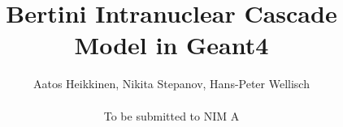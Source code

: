 \def \PIC {pictures}

\title{Bertini Intranuclear Cascade Model in {\sc Geant4} }

\author{Aatos Heikkinen, 
Nikita Stepanov, 
Hans-Peter Wellisch \\~ \\
{\small To be submitted to NIM A}}


\maketitle

\newpage
\tableofcontents
\newpage

  

 
 
%




\begin{appendix} 
%
\end{appendix} 


